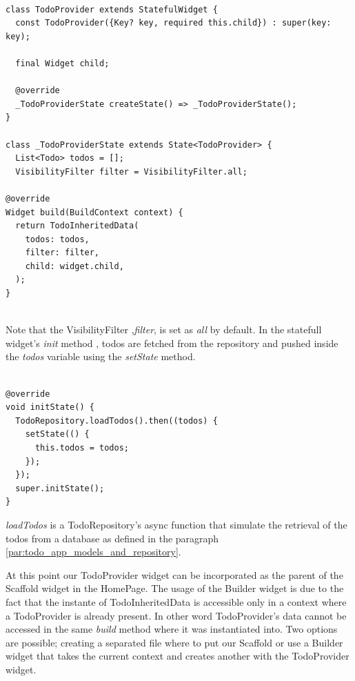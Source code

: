 \begin{verbatim}

class TodoProvider extends StatefulWidget {
  const TodoProvider({Key? key, required this.child}) : super(key: key);

  final Widget child;

  @override
  _TodoProviderState createState() => _TodoProviderState();
}

class _TodoProviderState extends State<TodoProvider> {
  List<Todo> todos = [];
  VisibilityFilter filter = VisibilityFilter.all;

@override
Widget build(BuildContext context) {
  return TodoInheritedData(
    todos: todos,
    filter: filter,
    child: widget.child,
  );
}
\end{verbatim}
\mbox{}\\
Note that the VisibilityFilter ,\textit{filter}, is set as \textit{all} by default.
In the statefull widget's \textit{init} method , todos are fetched from the repository and pushed inside the \textit{todos} variable using the \textit{setState} method.
\mbox{}\\

 \mbox{}

\begin{verbatim}

@override
void initState() {
  TodoRepository.loadTodos().then((todos) {
    setState(() {
      this.todos = todos;
    });
  });
  super.initState();
}
\end{verbatim}

\textit{loadTodos }is a TodoRepository’s async function that simulate the retrieval of the todos from a database as defined in the paragraph \ref{par:todo_app_models_and_repository}.

At this point our TodoProvider widget can be incorporated as the parent of the Scaffold widget in the HomePage. The usage of the Builder widget is due to the fact that the instante of TodoInheritedData is accessible only in a context where a TodoProvider is already present. In other word TodoProvider’s data cannot be accessed in the same \textit{build } method where it was instantiated into. Two options are possible; creating a separated file where to put our Scaffold or use a Builder widget that takes the current context and creates another with the TodoProvider widget.
\mbox{}\\


 \mbox{}

